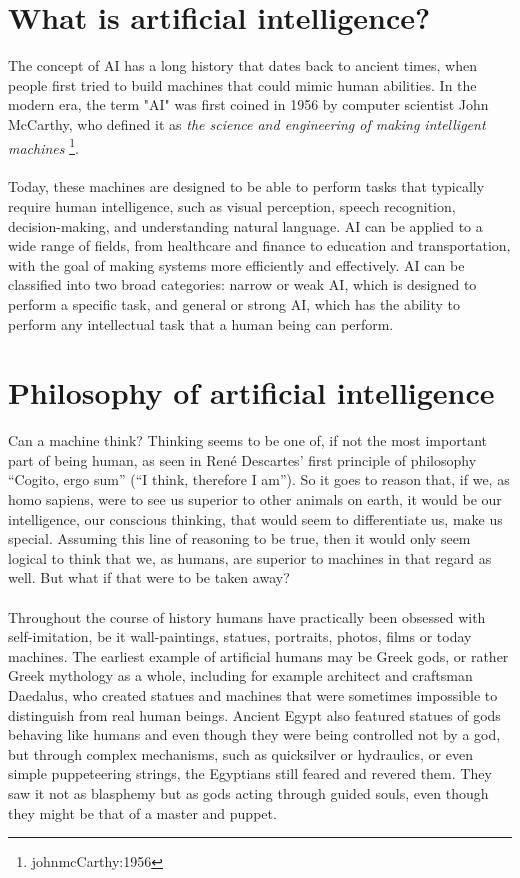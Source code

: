 \section{What is artificial intelligence?}
The concept of AI has a long history that dates back to ancient times, when people first tried to build machines that could mimic human abilities. In the modern era, the term "AI" was first coined in 1956 by computer scientist John McCarthy, who defined it as \textit{the science and engineering of making intelligent machines} \footnote{johnmcCarthy:1956}.
\\
\\
Today, these machines are designed to be able to perform tasks that typically require human intelligence, such as visual perception, speech recognition, decision-making, and understanding natural language. AI can be applied to a wide range of fields, from healthcare and finance to education and transportation, with the goal of making systems more efficiently and effectively. AI can be classified into two broad categories: narrow or weak AI, which is designed to perform a specific task, and general or strong AI, which has the ability to perform any intellectual task that a human being can perform.

\section{Philosophy of artificial intelligence}
Can a machine think? Thinking seems to be one of, if not the most important part of being human, as seen in René Descartes’ first principle of philosophy “Cogito, ergo sum” (“I think, therefore I am”). So it goes to reason that, if we, as homo sapiens, were to see us superior to other animals on earth, it would be our intelligence, our conscious thinking, that would seem to differentiate us, make us special. Assuming this line of reasoning to be true, then it would only seem logical to think that we, as humans, are superior to machines in that regard as well. But what if that were to be taken away?
\\
\\
Throughout the course of history humans have practically been obsessed with self-imitation, be it wall-paintings, statues, portraits, photos, films or today machines. The earliest example of artificial humans may be Greek gods, or rather Greek mythology as a whole, including for example architect and craftsman Daedalus, who created statues and machines that were sometimes impossible to distinguish from real human beings. Ancient Egypt also featured statues of gods behaving like humans and even though they were being controlled not by a god, but through complex mechanisms, such as quicksilver or hydraulics, or even simple puppeteering strings, the Egyptians still feared and revered them. They saw it not as blasphemy but as gods acting through guided souls, even though they might be that of a master and puppet.

